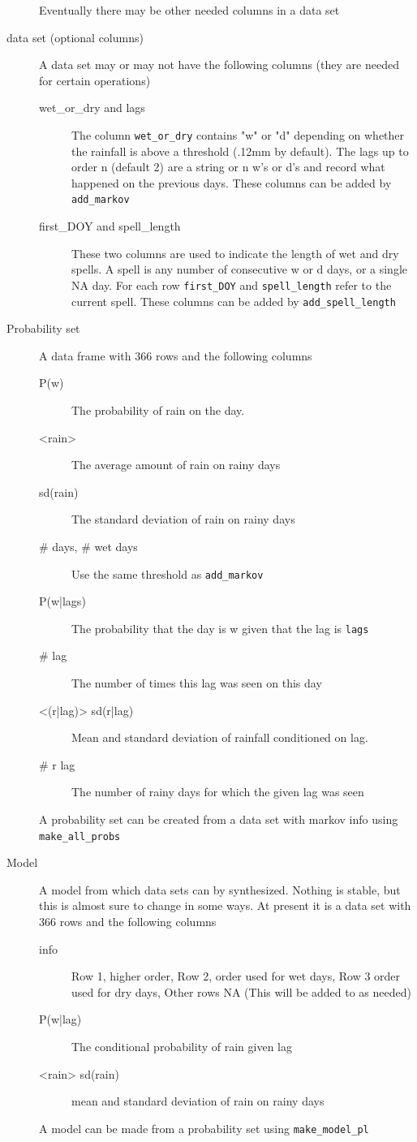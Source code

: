 \documentclass{article}
\begin{document}
\begin{description}
    Eventually there may be other needed columns in a data set
\item[data set (optional columns)]    A data set may or may not have the following
columns  (they are needed for certain operations)
     \begin{description}
     \item[wet\_or\_dry and lags]  The column {\tt wet\_or\_dry} contains "w" or "d" depending on whether the rainfall is above a threshold (.12mm by default).
     The lags up to order n (default 2) are a string or n w's or d's and
     record what happened on the previous days.  These columns can be
     added by {\tt add\_markov}
     \item[first\_DOY and spell\_length]  These two columns are used to indicate
     the length of wet and dry spells.  A spell is any number of consecutive
     w or d days, or a single NA day.  For each row {\tt first\_DOY} and
     {\tt spell\_length} refer to the current spell.   These columns can be added
     by {\tt add\_spell\_length}
     \end{description}
\item[Probability set]  A data frame with 366 rows and the following columns
     \begin{description}
     \item[P(w)]  The probability of rain on the day.
     \item[<rain>]  The average amount of rain on rainy days
     \item[sd(rain)] The standard deviation of rain on rainy days
     \item[ \# days, \# wet days]  Use the same threshold as {\tt add\_markov}
     \item[P(w|lags)]  The probability that the day is w given that the lag
     is {\tt lags}
     \item[\# lag]  The number of times this lag was seen on this day
     \item[<(r|lag)> sd(r|lag)]  Mean and standard deviation of rainfall
     conditioned on lag.
     \item[\# r lag]  The number of rainy days for which the given lag
     was seen
     \end{description}
     A probability set can be created from a data set with markov info using
{\tt make\_all\_probs}
\item[Model]  A model from which data sets can by synthesized.  Nothing is stable,
but this is almost sure to change in some ways.  At present it is a data set
with 366 rows and  the following columns
     \begin{description}
     \item[info]  Row 1, higher order, Row 2, order used for wet days, Row 3  order used for dry days, Other rows  NA  (This will be added to as needed)
     \item[P(w|lag)]  The conditional probability of rain given lag
     \item[<rain> sd(rain)] mean and standard deviation of rain on rainy days
     \end{description}
     A model can be made from a probability set using {\tt make\_model\_pl}
     
\end{description}
\end{document}
